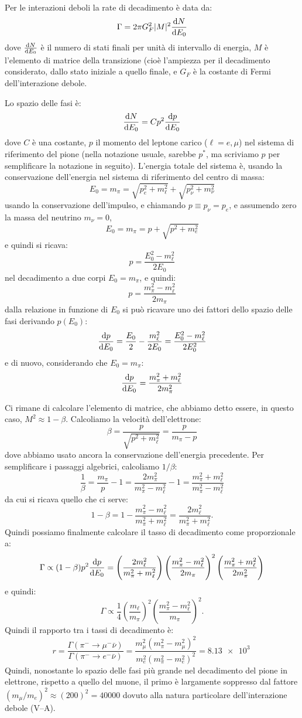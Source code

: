 \begin{Answer}
  Per le interazioni deboli la rate di decadimento \`e data da:
  \[
  \Gamma = 2\pi G_F^2\vert M \vert^2\dv{N}{E_0}
  \]
  dove $\dv{N}{E_0}$ \`e il numero di stati finali per unit\`a di
  intervallo di energia, $M$ \`e l'elemento di matrice della
  transizione (cio\`e l'ampiezza per il decadimento considerato, dallo
  stato iniziale a quello finale, e $G_F$ \`e la costante di Fermi
  dell'interazione debole.

  Lo spazio delle fasi \`e:
  \[
  \dv{N}{E_0} = C p^2 \dv{p}{E_0}
  \]
  dove $C$ \`e una costante, $p$ il momento del leptone carico
  ($\ell=e,\mu$) nel sistema di riferimento del pione (nella notazione
  usuale, sarebbe $p^*$, ma scriviamo $p$ per semplificare la
  notazione in seguito).  L'energia totale del sistema \`e, usando la
  conservazione dell'energia nel sistema di riferimento del centro di
  massa:
  \[
  E_0 = m_\pi = \sqrt{p_e^2 +m_\ell^2} + \sqrt{p_\nu^2+m^2_\nu}
  \]
  usando la conservazione dell'impulso, e chiamando $p \equiv
  p_\nu=p_e$, e assumendo zero la massa del neutrino $m_\nu=0$,
  \[
  E_0 = m_\pi = p + \sqrt{p^2+m^2_e}
  \]
  e quindi si ricava:
  \[
  p = \frac{E_0^2-m_\ell^2}{2E_0}
  \]
  nel decadimento a due corpi $E_0=m_\pi$, e quindi:
  \[
  p = \frac{m_\pi^2-m_\ell^2}{2m_\pi}
  \]
  dalla relazione in funzione di $E_0$ si pu\`o ricavare uno dei fattori dello spazio delle fasi derivando $p(E_0)$:
  \[
  \dv{p}{E_0} = \frac{E_0}{2} - \frac{m_\ell^2}{2E_0} = \frac{E_0^2-m_\ell^2}{2E_0^2}
  \]
  e di nuovo, considerando che $E_0=m_\pi$:
  \[
  \dv{p}{E_0} = \frac{m_\pi^2+m_\ell^2}{2m_\pi^2}
  \]

  Ci rimane di calcolare l'elemento di matrice, che abbiamo detto essere, in questo caso, $M^2 \approx 1-\beta$.
  Calcoliamo la velocit\`a dell'elettrone:
  \[
  \beta = \frac{p}{\sqrt{p^2+m_\ell^2}} = \frac{p}{m_\pi-p}
  \]
  dove abbiamo usato ancora la conservazione dell'energia precedente. Per semplificare i passaggi algebrici, calcoliamo $1/\beta$:
  \[
  \frac{1}{\beta} = \frac{m_\pi}{p}-1 = \frac{2m_\pi^2}{m_\pi^2-m_\ell^2} - 1 = \frac{m_\pi^2+m_\ell^2}{m_\pi^2-m_\ell^2}
  \]
  da cui si ricava quello che ci serve:
  \[
  1-\beta = 1-\frac{m_\pi^2-m_\ell^2}{m_\pi^2+m_\ell^2}  = \frac{2m_\ell^2}{m_\pi^2+m_\ell^2}.
  \]
  Quindi possiamo finalmente calcolare il tasso di decadimento come proporzionale a:
  \[
  \Gamma \propto (1-\beta)p^2\dv{p}{E_0} = \left(\frac{2m_\ell^2}{m_\pi^2+m_\ell^2}\right) \left( \frac{m_\pi^2-m_\ell^2}{2m_\pi} \right)^2 \left( \frac{m_\pi^2+m_\ell^2}{2m_\pi^2} \right)
  \]
  e quindi:
  \[
  \Gamma \propto \frac{1}{4}\left(\frac{m_\ell}{m_\pi}\right)^2  \left( \frac{m_\pi^2-m_\ell^2}{m_\pi} \right)^2.
  \]
  Quindi il rapporto tra i tassi di decadimento \`e:
  \[
  r = \frac{\Gamma(\pi^- \to \mu^-\bar \nu)}{\Gamma(\pi^- \to e^-\bar \nu)} = \frac{m_\mu^2(m_\pi^2-m_\mu^2)^2}{m_e^2(m_\pi^2-m_e^2)^2} = \SI{8.13e3}{}
  \]
  Quindi, nonostante lo spazio delle fasi pi\`u grande nel decadimento
  del pione in elettrone, rispetto a quello del muone, il primo \`e
  largamente soppresso dal fattore $(m_\mu/m_e)^2 \approx (200)^2 =
  40000$ dovuto alla natura particolare dell'interazione debole
  (V--A).
\end{Answer}
